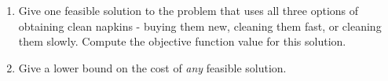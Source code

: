 \documentclass[twoside]{article}%
\begin{document}
\begin{enumerate}
\item Give one feasible solution to the problem that uses all three options of obtaining clean
napkins - buying them new, cleaning them fast, or cleaning them slowly. Compute the 
objective function value for this solution.
\item Give a lower bound on the cost of {\it any} feasible solution.
\end{enumerate}
\end{document}
